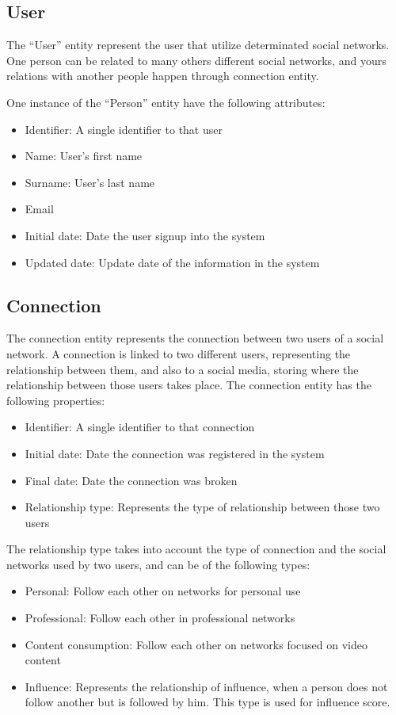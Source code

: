 \subsection{User}

The “User” entity represent the user that utilize determinated social networks. One person can be related to many others different social networks, and yours relations with another people happen through connection entity. 

One instance of the “Person” entity have the following attributes:


\begin{itemize}
\item Identifier: A single identifier to that user
\item Name: User’s first name
\item Surname: User’s last name
\item Email
\item Initial date: Date the user signup into the system
\item Updated date: Update date of the information in the system
\end{itemize}

\subsection{Connection}
The connection entity represents the connection between two users of a social network. A connection is linked to two different users, representing the relationship between them, and also to a social media, storing where the relationship between those users takes place. The connection entity has the following properties:

\begin{itemize}
    \item Identifier: A single identifier to that connection
    \item Initial date: Date the connection was registered in the system
    \item Final date: Date the connection was broken
    \item Relationship type: Represents the type of relationship between those two users
\end{itemize}


The relationship type takes into account the type of connection and the social networks used by two users, and can be of the following types:

\begin{itemize}
    \item Personal: Follow each other on networks for personal use
    \item Professional: Follow each other in professional networks
    \item Content consumption: Follow each other on networks focused on video content
    \item Influence: Represents the relationship of influence, when a person does not follow another but is followed by him. This type is used for influence score.
\end{itemize}


